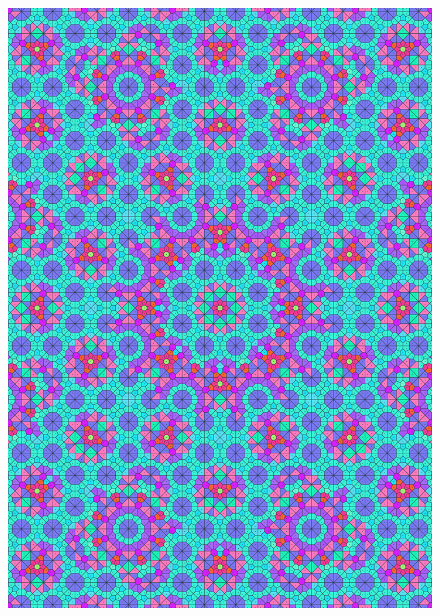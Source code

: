 \documentclass[text.tex]{subfiles}
\begin{document}
\begin{figure}[h!]
\centering
\includegraphics[width=1\textwidth]{img/results/circle8/quasi_circle_107106_(-11_5alpha_1).pdf}
\end{figure}
\end{document}

